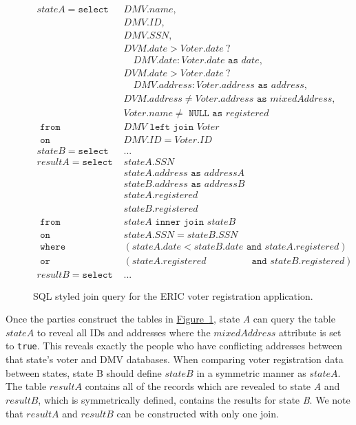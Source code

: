 \documentclass[11pt,letterpaper]{article}
\newcommand{\namedref}[2]{\hyperref[#2]{#1~\ref*{#2}}}
\newcommand{\figureref}[1]{\namedref{Figure}{#1}}
\begin{document}
\begin{figure}[ht]

	{
		\scriptsize
		\begin{align*}	
		stateA = \texttt{select }& DMV.name,\\
		& DMV.ID, \\
		& DMV.SSN, \\
		& DVM.date > Voter.date \ ?\\
		&\quad DMV.date : Voter.date \texttt{ as } date,\\
		& DVM.date > Voter.date \ ?\\
		&\quad  DMV.address : Voter.address \texttt{ as } address,\\
		& DVM.address \neq Voter.address \texttt{ as } mixedAddress, \\ 
		& Voter.name \neq \texttt{ NULL as } registered \\
		\texttt{ from } & DMV \texttt{ left join } Voter \\
		\texttt{ on } & DMV.ID = Voter.ID \\
		stateB = \texttt{select }&...\\
		resultA = \texttt{select } & stateA.SSN \\
		& stateA.address \texttt{ as } addressA\\
		& stateB.address \texttt{ as } addressB\\
		& stateA.registered \\
		& stateB.registered \\
		\texttt{ from } & stateA \texttt{ inner join } stateB \\
		\texttt{ on } & stateA.SSN = stateB.SSN\\
		\texttt{ where } & (stateA.date < stateB.date \texttt{ and } stateA.registered ) \\
		\texttt{ or } & (stateA.registered \qquad \qquad \ \, \texttt{ and }stateB.registered )\\
		resultB = \texttt{select } & ...
		\end{align*}
	}
	\caption{SQL styled join query for the ERIC voter registration application. \label{fig:voterQuery}}
\end{figure}

Once the parties construct the tables in \figureref{fig:voterQuery}, state \emph{A} can query the table $stateA$ to reveal all IDs and addresses where the $mixedAddress$ attribute is set to \texttt{true}. This reveals exactly the people who have conflicting addresses between that state's voter and DMV databases. When comparing voter registration data between states, state B should define $stateB$ in a symmetric manner as $stateA$. The table $resultA$ contains all of the records which are revealed to state \emph{A} and $resultB$, which is symmetrically defined, contains the results for state \emph{B}. We note that $resultA$ and $resultB$ can be constructed with only one join.
\end{document}
